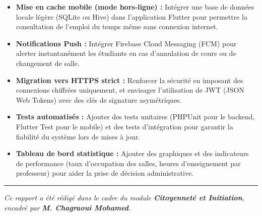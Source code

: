 \documentclass[12pt, a4paper]{report}
\begin{document}
\begin{itemize}
    \item \textbf{Mise en cache mobile (mode hors-ligne) :} Intégrer une base de données locale légère (SQLite ou Hive) dans l'application Flutter pour permettre la consultation de l'emploi du temps même sans connexion internet.
    \item \textbf{Notifications Push :} Intégrer Firebase Cloud Messaging (FCM) pour alerter instantanément les étudiants en cas d'annulation de cours ou de changement de salle.
    \item \textbf{Migration vers HTTPS strict :} Renforcer la sécurité en imposant des connexions chiffrées uniquement, et envisager l'utilisation de JWT (JSON Web Tokens) avec des clés de signature asymétriques.
    \item \textbf{Tests automatisés :} Ajouter des tests unitaires (PHPUnit pour le backend, Flutter Test pour le mobile) et des tests d'intégration pour garantir la fiabilité du système lors de mises à jour.
    \item \textbf{Tableau de bord statistique :} Ajouter des graphiques et des indicateurs de performance (taux d'occupation des salles, heures d'enseignement par professeur) pour aider la prise de décision administrative.
\end{itemize}

\vspace{1cm}
\noindent\rule{\textwidth}{0.5pt}
\begin{center}
    \textit{Ce rapport a été rédigé dans le cadre du module \textbf{Citoyenneté et Initiation}, encadré par \textbf{M. Chagraoui Mohamed}.}
\end{center}
\end{document}
